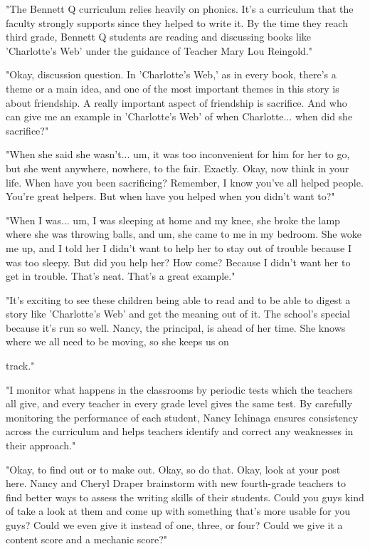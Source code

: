 "The Bennett Q curriculum relies heavily on phonics. It's a curriculum that the faculty strongly supports since they helped to write it. By the time they reach third grade, Bennett Q students are reading and discussing books like 'Charlotte's Web' under the guidance of Teacher Mary Lou Reingold."

"Okay, discussion question. In 'Charlotte's Web,' as in every book, there's a theme or a main idea, and one of the most important themes in this story is about friendship. A really important aspect of friendship is sacrifice. And who can give me an example in 'Charlotte's Web' of when Charlotte... when did she sacrifice?"

"When she said she wasn't... um, it was too inconvenient for him for her to go, but she went anywhere, nowhere, to the fair. Exactly. Okay, now think in your life. When have you been sacrificing? Remember, I know you've all helped people. You're great helpers. But when have you helped when you didn't want to?"

"When I was... um, I was sleeping at home and my knee, she broke the lamp where she was throwing balls, and um, she came to me in my bedroom. She woke me up, and I told her I didn't want to help her to stay out of trouble because I was too sleepy. But did you help her? How come? Because I didn't want her to get in trouble. That's neat. That's a great example."

"It's exciting to see these children being able to read and to be able to digest a story like 'Charlotte's Web' and get the meaning out of it. The school's special because it's run so well. Nancy, the principal, is ahead of her time. She knows where we all need to be moving, so she keeps us on

track."

"I monitor what happens in the classrooms by periodic tests which the teachers all give, and every teacher in every grade level gives the same test. By carefully monitoring the performance of each student, Nancy Ichinaga ensures consistency across the curriculum and helps teachers identify and correct any weaknesses in their approach."

"Okay, to find out or to make out. Okay, so do that. Okay, look at your post here. Nancy and Cheryl Draper brainstorm with new fourth-grade teachers to find better ways to assess the writing skills of their students. Could you guys kind of take a look at them and come up with something that's more usable for you guys? Could we even give it instead of one, three, or four? Could we give it a content score and a mechanic score?"

